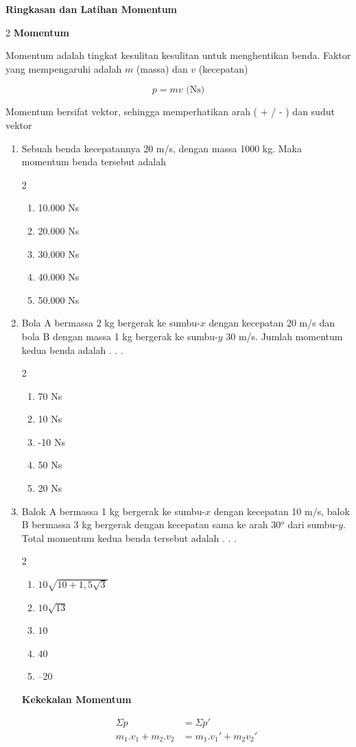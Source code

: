 \documentclass[11pt,a4paper]{extarticle}
\newcommand{\pilgani}[1]{                            \vspace{-0.3cm}\begin{multicols}{2}
 \begin{enumerate}[label=\Alph*., itemsep=0pt,topsep=0pt,leftmargin=*,align=Center]#1                     \end{enumerate}
 \phantom{ini cuma sapi, wedus, dan ayam}
 \end{multicols}}
\begin{document}
 \textbf{Ringkasan dan Latihan Momentum} \phantom{ini nama siswa yang aaamengerjakan soal kuis ini }  

\begin{multicols*}{2}
\textbf{Momentum}

Momentum adalah tingkat kesulitan kesulitan untuk menghentikan benda. Faktor yang mempengaruhi adalah $m$ (massa) dan $v$ (kecepatan)

$$ p = m v \text{  (Ns)}$$

Momentum bersifat vektor, sehingga memperhatikan arah ( + / - ) dan sudut vektor 


\begin{enumerate}
\item Sebuah benda kecepatannya 20 m/s, dengan massa 1000 kg. Maka momentum benda tersebut adalah 
\pilgani{
        \item 10.000 Ns
        \item 20.000 Ns
        \item 30.000 Ns
        \item 40.000 Ns
        \item 50.000 Ns
        }
\item Bola A bermassa 2 kg bergerak ke sumbu-$x$ dengan kecepatan 20 m/s dan bola B dengan massa 1 kg bergerak ke sumbu-$y$ 30 m/s. Jumlah momentum kedua benda adalah . . .
\pilgani{
        \item 70 Ns
        \item 10 Ns
        \item -10 Ns
        \item 50 Ns
        \item 20 Ns
        }

\item Balok A bermassa 1 kg bergerak ke sumbu-$x$ dengan kecepatan 10 m/s, balok B bermassa 3 kg bergerak dengan kecepatan sama ke arah 30$^o$ dari sumbu-$y$. Total momentum kedua benda tersebut adalah . . .
\pilgani{
        \item $10\sqrt{10+1,5\sqrt{3}}$
        \item $10\sqrt{13}$
        \item $10$
        \item $40$
        \item --20
        }

\textbf{Kekekalan Momentum}

\begin{align*}
\Sigma p &= \Sigma p'\\
m_1.v_1 + m_2.v_2 &= m_1.v_1' +m_2v_2'\\
\end{align*}


\end{enumerate}
\end{multicols*}
\end{document}
